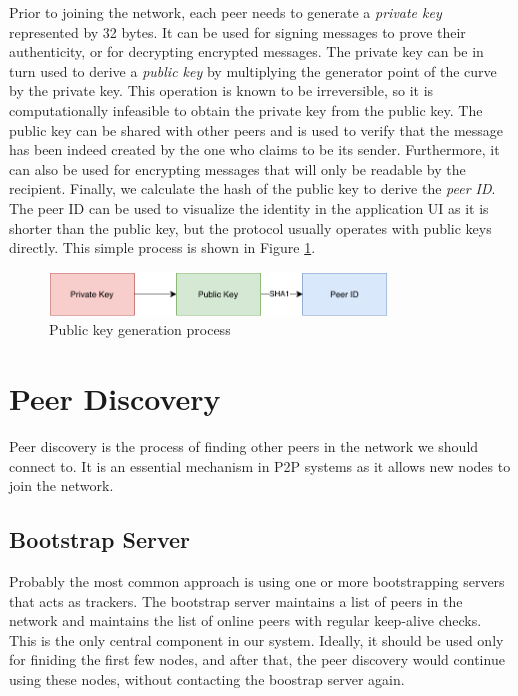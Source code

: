 Prior to joining the network, each peer needs to generate a \textit{private key} represented by 32 bytes. It can be used for signing messages to prove their authenticity, or for decrypting encrypted messages. The private key can be in turn used to derive a \textit{public key} by multiplying the generator point of the curve by the private key. This operation is known to be irreversible, so it is computationally infeasible to obtain the private key from the public key. The public key can be shared with other peers and is used to verify that the message has been indeed created by the one who claims to be its sender. Furthermore, it can also be used for encrypting messages that will only be readable by the recipient. Finally, we calculate the hash of the public key to derive the \textit{peer ID}. The peer ID can be used to visualize the identity in the application UI as it is shorter than the public key, but the protocol usually operates with public keys directly. This simple process is shown in Figure \ref{keys}.

\begin{figure}[h!]
    \centering
    \includegraphics[width=0.8\textwidth]{diagrams/keys}
    \caption{Public key generation process}
    \label{keys}
\end{figure}

\section{Peer Discovery}

Peer discovery is the process of finding other peers in the network we should connect to. It is an essential mechanism in P2P systems as it allows new nodes to join the network.

\subsection{Bootstrap Server}

Probably the most common approach is using one or more bootstrapping servers that acts as trackers. The bootstrap server maintains a list of peers in the network and maintains the list of online peers with regular keep-alive checks. This is the only central component in our system. Ideally, it should be used only for finiding the first few nodes, and after that, the peer discovery would continue using these nodes, without contacting the boostrap server again.

